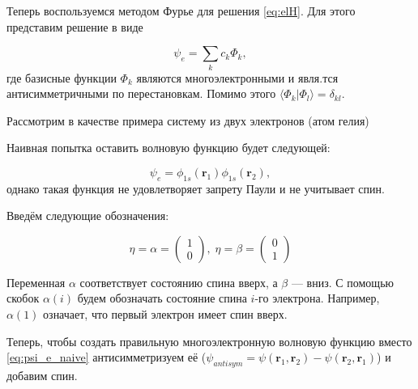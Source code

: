 \documentclass[12pt, oneside]{article}
\numberwithin{equation}{section}  %
\begin{document}
Теперь воспользуемся методом Фурье для решения \eqref{eq:elH}. Для этого представим решение в виде

\begin{equation}
    \psi_e = \sum_k c_k \Phi_k,
\end{equation}
где базисные функции \(\Phi_k\) являются многоэлектронными и явля.тся антисимметричными по перестановкам. Помимо этого \(\langle \Phi_k | \Phi_l \rangle = \delta_{kl}\).

Рассмотрим в качестве примера систему из двух электронов (атом гелия)

Наивная попытка оставить волновую функцию будет следующей:

\begin{equation}
    \psi_e = \phi_{1s}(\bm{r}_1) \phi_{1s}(\bm{r}_2),
    \label{eq:psi_e_naive}
\end{equation}
однако такая функция не удовлетворяет запрету Паули и не учитывает спин.

Введём следующие обозначения:

\begin{equation}
    \eta = \alpha = \begin{pmatrix} 1 \\ 0 \end{pmatrix}, \;
    \eta = \beta = \begin{pmatrix} 0 \\ 1 \end{pmatrix}
\end{equation}

Переменная \(\alpha\) соответствует состоянию спина вверх, а \(\beta\) — вниз. С помощью скобок \(\alpha(i)\) будем обозначать состояние спина \(i\)-го электрона. Например, \(\alpha(1)\) означает, что первый электрон имеет спин вверх. 

Теперь, чтобы создать правильную многоэлектронную волновую функцию вместо \eqref{eq:psi_e_naive} антисимметризуем её (\(\psi_{antisym} = \psi(\bm{r}_1, \bm{r}_2) - \psi(\bm{r}_2, \bm{r}_1)\)) и добавим спин.
\end{document}
